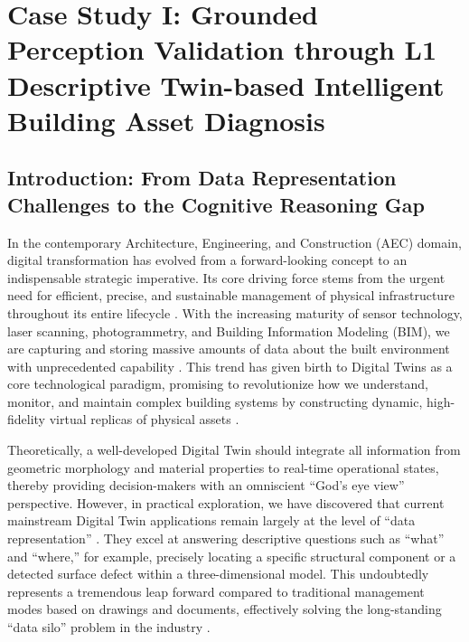 
\chapter{Case Study I: Grounded Perception Validation through L1 Descriptive Twin-based Intelligent Building Asset Diagnosis} \label{chp:building}

\section{Introduction: From Data Representation Challenges to the Cognitive Reasoning Gap}

In the contemporary Architecture, Engineering, and Construction (AEC) domain, digital transformation has evolved from a forward-looking concept to an indispensable strategic imperative. Its core driving force stems from the urgent need for efficient, precise, and sustainable management of physical infrastructure throughout its entire lifecycle \cite{boje2020towards, lu2020digital}. With the increasing maturity of sensor technology, laser scanning, photogrammetry, and Building Information Modeling (BIM), we are capturing and storing massive amounts of data about the built environment with unprecedented capability \cite{tang2019retrieving, li2024single}. This trend has given birth to Digital Twins as a core technological paradigm, promising to revolutionize how we understand, monitor, and maintain complex building systems by constructing dynamic, high-fidelity virtual replicas of physical assets \cite{tao2018digital}.

Theoretically, a well-developed Digital Twin should integrate all information from geometric morphology and material properties to real-time operational states, thereby providing decision-makers with an omniscient ``God's eye view'' perspective. However, in practical exploration, we have discovered that current mainstream Digital Twin applications remain largely at the level of ``data representation'' \cite{negri2017review}. They excel at answering descriptive questions such as ``what'' and ``where,'' for example, precisely locating a specific structural component or a detected surface defect within a three-dimensional model. This undoubtedly represents a tremendous leap forward compared to traditional management modes based on drawings and documents, effectively solving the long-standing ``data silo'' problem in the industry \cite{bruno2018historic}.

